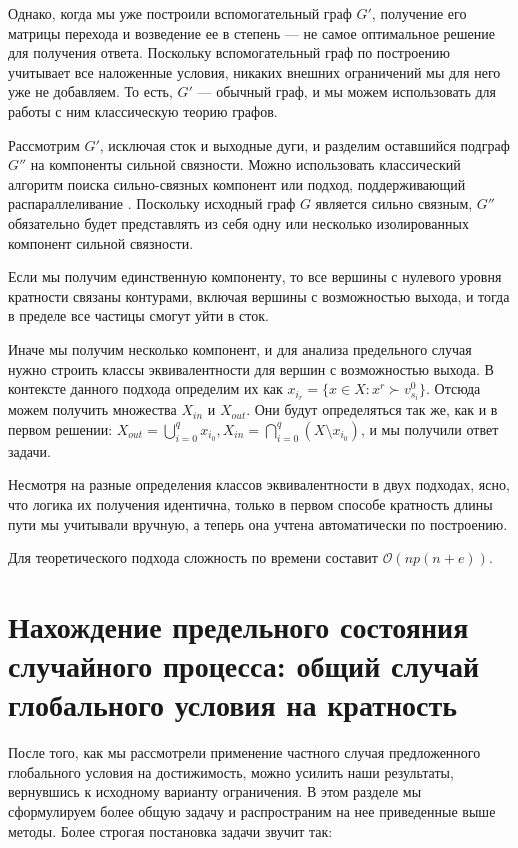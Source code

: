 Однако, когда мы уже построили вспомогательный граф $G'$, получение его матрицы перехода и возведение ее в степень --- не самое оптимальное решение для получения ответа. Поскольку вспомогательный граф по построению учитывает все наложенные условия, никаких внешних ограничений мы для него уже не добавляем. То есть, $G'$ --- обычный граф, и мы можем использовать для работы с ним классическую теорию графов. 

Рассмотрим $G'$, исключая сток и выходные дуги, и разделим оставшийся подграф $G''$ на компоненты сильной связности. Можно использовать классический алгоритм поиска сильно-связных компонент \cite{Tar} или подход, поддерживающий распараллеливание \cite{Par2}.
Поскольку исходный граф $G$ является сильно связным, $G''$ обязательно будет представлять из себя одну или несколько изолированных компонент сильной связности. %

Если мы получим единственную компоненту, то все вершины с нулевого уровня кратности связаны контурами, включая вершины с возможностью выхода, и тогда в пределе все частицы смогут уйти в сток. 

Иначе мы получим несколько компонент, и для анализа предельного случая нужно строить классы эквивалентности для вершин с возможностью выхода. В контексте данного подхода определим их как $x_{i_r} = \{x \in X: x^r \succ v^0_{s_i} \}$. Отсюда можем получить множества $X_{in}$ и $X_{out}$. Они будут определяться так же, как и в первом решении: $X_{out} = \bigcup\limits_{i=0}^q x_{i_0}, X_{in} = \bigcap\limits_{i=0}^q (X \setminus x_{i_0})$, и мы получили ответ задачи. 

Несмотря на разные определения классов эквивалентности в двух подходах, ясно, что логика их получения идентична, только в первом способе кратность длины пути мы учитывали вручную, а теперь она учтена автоматически по построению. 

Для теоретического подхода сложность по времени составит  $\mathcal{O}(np(n + e))$.


\section{Нахождение предельного состояния случайного процесса: общий случай глобального условия на кратность}

После того, как мы рассмотрели применение частного случая предложенного глобального условия на достижимость, можно усилить наши результаты, вернувшись к исходному варианту ограничения. В этом разделе мы сформулируем более общую задачу и распространим на нее приведенные выше методы. Более строгая постановка задачи звучит так: 	

